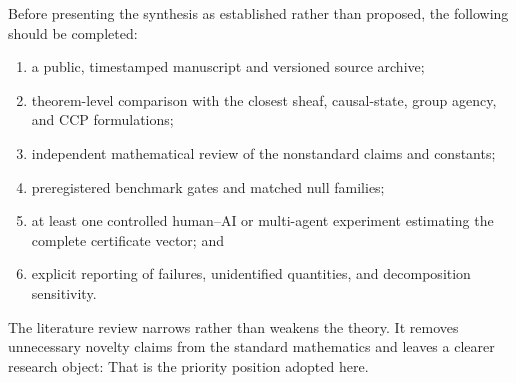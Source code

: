 Before presenting the synthesis as established rather than proposed, the
following should be completed:
\begin{enumerate}
\item a public, timestamped manuscript and versioned source archive;
\item theorem-level comparison with the closest sheaf, causal-state, group
 agency, and CCP formulations;
\item independent mathematical review of the nonstandard claims and constants;
\item preregistered benchmark gates and matched null families;
\item at least one controlled human--AI or multi-agent experiment estimating
 the complete certificate vector; and
\item explicit reporting of failures, unidentified quantities, and
 decomposition sensitivity.
\end{enumerate}


The literature review narrows rather than weakens the theory. It removes
unnecessary novelty claims from the standard mathematics and leaves a clearer
research object:
That is the priority position adopted here.
